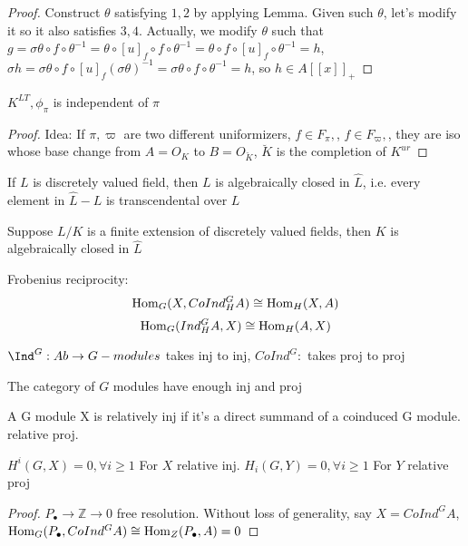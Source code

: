\documentclass[main]{subfiles}
\begin{document}
\begin{proof}
Construct $\theta$ satisfying $1,2$ by applying Lemma. Given such $\theta$, let's modify it so it also satisfies $3,4$. Actually, we modify $\theta$ such that $g=\sigma\theta\circ f\circ\theta^{-1}=\theta\circ[u]_f\circ f\circ\theta^{-1}=\theta\circ f\circ[u]_f\circ\theta^{-1}=h$, $\sigma h=\sigma\theta\circ f\circ[u]_f(\sigma\theta)^{-1}=\sigma\theta\circ f\circ\theta^{-1}=h$, so $h\in A[[x]]_+$
\end{proof}

\begin{theorem}
$K^{LT},\phi_\pi$ is independent of $\pi$
\end{theorem}

\begin{proof}
Idea: If $\pi,\varpi$ are two different uniformizers, $f\in F_\pi,$, $f\in F_\varpi,$, they are iso whose base change from $A=O_K$ to $B=O_{\breve K}$, $\breve K$ is the completion of $K^{ur}$
\end{proof}

\begin{fact}
If $L$ is discretely valued field, then $L$ is algebraically closed in $\hat L$, i.e. every element in $\hat L-L$ is transcendental over $L$
\end{fact}

\begin{fact}
Suppose $L/K$ is a finite extension of discretely valued fields, then $K$ is algebraically closed in $\hat L$
\end{fact}

Frobenius reciprocity:
\[\operatorname{Hom}_G(X,CoInd^G_HA)\cong\operatorname{Hom}_H(X,A)\]
\[\operatorname{Hom}_G(Ind^G_HA,X)\cong\operatorname{Hom}_H(A,X)\]

\begin{lemma}
$\Ind^G:Ab\to G-modules$ takes inj to inj, $CoInd^G:$ takes proj to proj
\end{lemma}

\begin{corollary}
The category of $G$ modules have enough inj and proj
\end{corollary}

A G module X is relatively inj if it's a direct summand of a coinduced G module. relative proj.

\begin{proposition}
$H^i(G,X)=0,\forall i\geq1$ For $X$ relative inj. $H_i(G,Y)=0,\forall i\geq1$ For $Y$ relative proj
\end{proposition}

\begin{proof}
$P_\bullet\to\mathbb Z\to0$ free resolution. Without loss of generality, say $X=CoInd^GA$, $\operatorname{Hom}_G(P_\bullet,CoInd^GA)\cong\operatorname{Hom}_Z(P_\bullet,A)=0$
\end{proof}
\end{document}

